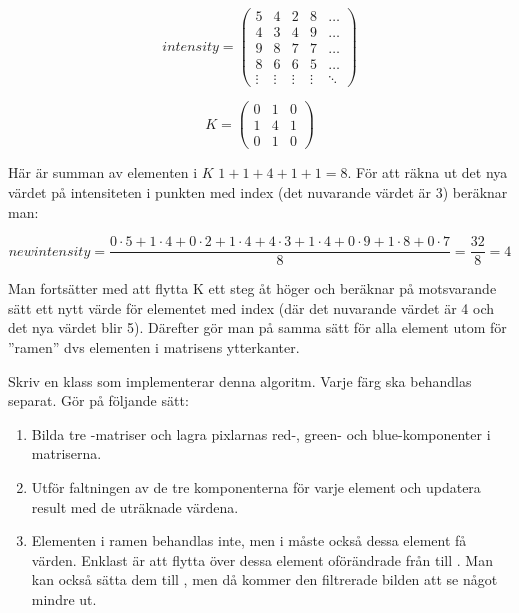 \begin{minipage}{5cm}
\begin{displaymath}
\mathit{intensity} = \left(
\begin{array}{ccccc}
5 & 4 & 2 & 8 & \ldots \\
4 & 3 & 4 & 9 & \ldots \\
9 & 8 & 7 & 7 & \ldots \\
8 & 6 & 6 & 5 & \ldots \\
\vdots & \vdots & \vdots & \vdots & \ddots
\end{array}
\right)
\end{displaymath}
\end{minipage}\hspace{2cm}
\begin{minipage}{5cm}
\begin{displaymath}
K = \left(
\begin{array}{ccc}
0 & 1 & 0 \\
1 & 4 & 1 \\
0 & 1 & 0
\end{array}
\right)
\end{displaymath}
\end{minipage}

Här är summan av elementen i $K$ $1+1+4+1+1 = 8$. För att räkna ut det nya värdet på intensiteten i punkten med index  (det nuvarande värdet är 3) beräknar man:

\begin{displaymath}
\mathit{newintensity} = \frac{0 \cdot 5 + 1 \cdot 4 + 0 \cdot 2 + 1 \cdot 4 + 4 \cdot 3 + 1 \cdot 4 + 0 \cdot 9 + 1 \cdot 8 + 0 \cdot 7}{8} = \frac{32}{8} = 4
\end{displaymath}


Man fortsätter med att flytta K ett steg åt höger och beräknar på motsvarande sätt ett nytt värde för elementet med index  (där det nuvarande värdet är 4 och det nya värdet blir 5). Därefter gör man på samma sätt för alla element utom för ”ramen” dvs elementen i matrisens ytterkanter.

Skriv en klass  som implementerar denna algoritm. Varje färg ska behandlas separat. Gör på följande sätt:
\begin{enumerate}
	\item Bilda tre -matriser och lagra pixlarnas red-, green- och blue-komponenter i matriserna.
	\item Utför faltningen av de tre komponenterna för varje element och updatera result med de uträknade värdena.
	\item Elementen i ramen behandlas inte, men i  måste också dessa element få värden. Enklast är att flytta över dessa element oförändrade från  till . Man kan också sätta dem till , men då kommer den filtrerade bilden att se något mindre ut.
\end{enumerate}

